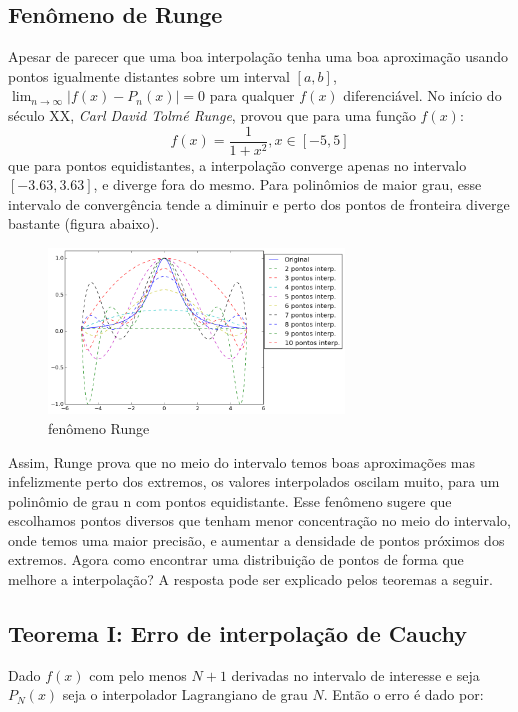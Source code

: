 \pagebreak
\newpage

\subsection{Fenômeno de Runge}
 Apesar de parecer que uma boa interpolação tenha uma boa aproximação usando pontos igualmente distantes sobre um interval $[a,b]$, $\lim_{n \to \infty} |f(x) - P_n(x)| = 0$ para qualquer $f(x)$ diferenciável.
 No início do século XX, \emph{Carl David Tolmé Runge}, provou que para uma função $f(x)$:
 \begin{equation}
 f(x) = \frac{1}{1 + x^2} , x \in [-5,5]
 \end{equation}
 que para pontos equidistantes, a interpolação converge apenas no intervalo $[-3.63,3.63]$, e diverge fora do mesmo. Para polinômios de maior grau, esse intervalo de convergência tende a diminuir e perto dos pontos de fronteira diverge bastante (figura abaixo).

\begin{figure}[htp]
\includegraphics[width=0.7\textwidth, center]{figuras/fenomeno_runge.png}
\caption{fenômeno Runge}
\end{figure}

 Assim, Runge prova que no meio do intervalo temos boas aproximações mas infelizmente perto dos extremos, os valores interpolados oscilam muito, para um polinômio de grau n com pontos equidistante. Esse fenômeno sugere que escolhamos pontos diversos que tenham menor concentração no meio do intervalo, onde temos uma maior precisão, e aumentar a densidade de pontos próximos dos extremos.
 Agora como encontrar uma distribuição de pontos de forma que melhore a interpolação? A resposta pode ser explicado pelos teoremas a seguir.
\pagebreak
\subsection{ Teorema I: Erro de interpolação de Cauchy}

 Dado $f(x)$  com pelo menos $N+1$ derivadas no intervalo de interesse e seja $P_N(x)$ seja o interpolador Lagrangiano de grau $N$. Então o erro é dado por:
 
